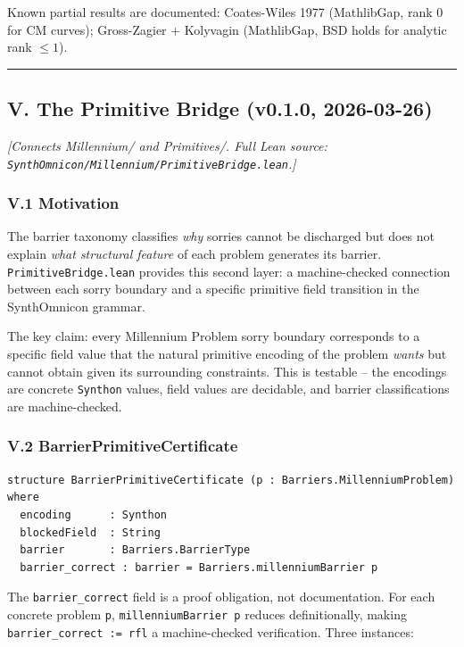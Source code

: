 \documentclass[12pt,a4paper]{article}
\begin{document}
Known partial results are documented: Coates-Wiles 1977 (MathlibGap, rank 0 for CM curves); Gross-Zagier + Kolyvagin (MathlibGap, BSD holds for analytic rank $\leq 1$).

\begin{center}
\rule{0.5\textwidth}{0.4pt}
\end{center}

\subsection{V. The Primitive Bridge (v0.1.0, 2026-03-26)}

\emph{{[}Connects Millennium/ and Primitives/. Full Lean source: \texttt{SynthOmnicon/Millennium/PrimitiveBridge.lean}.{]}}

\subsubsection{V.1 Motivation}

The barrier taxonomy classifies \emph{why} sorries cannot be discharged but does not explain \emph{what structural feature} of each problem generates its barrier. \texttt{PrimitiveBridge.lean} provides this second layer: a machine-checked connection between each sorry boundary and a specific primitive field transition in the SynthOmnicon grammar.

The key claim: every Millennium Problem sorry boundary corresponds to a specific field value that the natural primitive encoding of the problem \emph{wants} but cannot obtain given its surrounding constraints. This is testable  --  the encodings are concrete \texttt{Synthon} values, field values are decidable, and barrier classifications are machine-checked.

\subsubsection{V.2 BarrierPrimitiveCertificate}

\begin{lstlisting}[language=lean]
structure BarrierPrimitiveCertificate (p : Barriers.MillenniumProblem) where
  encoding      : Synthon
  blockedField  : String
  barrier       : Barriers.BarrierType
  barrier_correct : barrier = Barriers.millenniumBarrier p
\end{lstlisting}

The \texttt{barrier\_correct} field is a proof obligation, not documentation. For each concrete problem \texttt{p}, \texttt{millenniumBarrier p} reduces definitionally, making \texttt{barrier\_correct := rfl} a machine-checked verification. Three instances:
\end{document}
